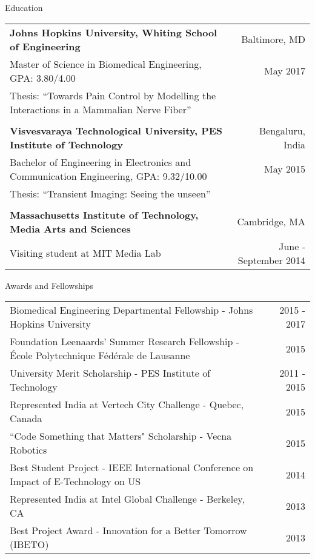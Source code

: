 \documentclass{resume}
\begin{document}
\thispagestyle{empty}
  \begin{rSection}{Education}
\begin{tabular*}{\textwidth}{@{\extracolsep{\fill}}lr@{}}
\textbf{Johns Hopkins University, Whiting School of Engineering} & Baltimore, MD \\
{Master of Science in Biomedical Engineering}, GPA: 3.80/4.00 & May 2017 \\
Thesis: {``Towards Pain Control by Modelling the Interactions in a Mammalian Nerve Fiber''}\\ \\
\textbf{Visvesvaraya Technological University, PES Institute of Technology} & Bengaluru, India \\
{Bachelor of Engineering in Electronics and Communication Engineering}, GPA: 9.32/10.00 & May 2015 \\
Thesis: {``Transient Imaging: Seeing the unseen''}\\ \\
\textbf{Massachusetts Institute of Technology, Media Arts and Sciences} & Cambridge, MA\\
{Visiting student at MIT Media Lab} & June - September 2014 \\           
\end{tabular*}
  \end{rSection}

\vspace{1em}

        \begin{rSection}{Awards and Fellowships}
\begin{tabular*}{\textwidth}{@{\extracolsep{\fill}}lr@{}}
Biomedical Engineering Departmental Fellowship - Johns Hopkins University & 2015 - 2017\\ 
Foundation Leenaards' Summer Research Fellowship - École Polytechnique Fédérale de Lausanne &  2015\\
University Merit Scholarship - PES Institute of Technology & 2011 - 2015 \\ 
Represented India at Vertech City Challenge - Quebec, Canada  & 2015\\
``Code Something that Matters" Scholarship - Vecna Robotics & 2015\\
Best Student Project - IEEE International Conference on Impact of E-Technology on US & 2014\\
Represented India at Intel Global Challenge - Berkeley, CA & 2013 \\
Best Project Award - Innovation for a Better Tomorrow (IBETO)  & 2013\\
\end{tabular*}
    \end{rSection}
\end{document}

